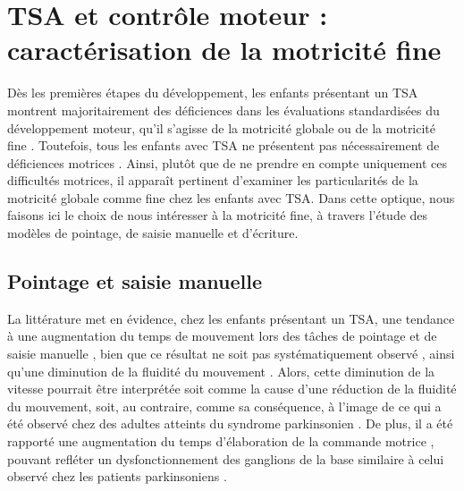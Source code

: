 \section{TSA et contrôle moteur : caractérisation de la motricité fine}
\label{sec:controle_moteur}
Dès les premières étapes du développement, les enfants présentant un TSA montrent majoritairement des déficiences dans les évaluations standardisées du développement moteur, qu'il s'agisse de la motricité globale ou de la motricité fine \parencite{hocking_what_2017}. %
Toutefois, tous les enfants avec TSA ne présentent pas nécessairement de déficiences motrices \parencite{hocking_what_2017}. Ainsi, plutôt que de ne prendre en compte uniquement ces difficultés motrices, il apparaît pertinent d'examiner les particularités de la motricité globale comme fine chez les enfants avec TSA. Dans cette optique, nous faisons ici le choix de nous intéresser à la motricité fine, à travers l'étude des modèles de pointage, de saisie manuelle et d'écriture.

\subsection{Pointage et saisie manuelle}\label{sec:pointage}

La littérature met en évidence, chez les enfants présentant un TSA, une tendance à une augmentation du temps de mouvement lors des tâches de pointage et de saisie manuelle \parencite{benchekri_mieux_2024, Glazebrook2006Jul, forti_motor_2011}, bien que ce résultat ne soit pas systématiquement observé \parencite{Papadopoulos2012Jan, Rinehart2006Aug}, ainsi qu'une diminution de la fluidité du mouvement \parencite{benchekri_mieux_2024}. Alors, cette diminution de la vitesse pourrait être interprétée soit comme la cause d'une réduction de la fluidité du mouvement, soit, au contraire, comme sa conséquence, à l'image de ce qui a été observé chez des adultes atteints du syndrome parkinsonien \parencite{benchekri_mieux_2024}.
De plus, il a été rapporté une augmentation du temps d'élaboration de la commande motrice \parencite{Glazebrook2006Jul, Rinehart2006Aug}, pouvant refléter un dysfonctionnement des ganglions de la base similaire à celui observé chez les patients parkinsoniens \parencite{Rinehart2006Aug}.

